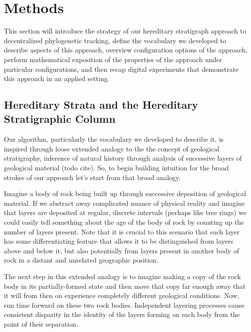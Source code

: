 \section{Methods} \label{sec:methods}

This section will introduce the strategy of our hereditary stratigraph approach to decentralized phylogenetic tracking, define the vocabulary we developed to describe aspects of this approach, overview configuration options of the approach, perform mathematical exposition of the properties of the approach under particular configurations, and then recap digital experiments that demonstrate this approach in an applied setting.

\subsection{Hereditary Strata and the Hereditary Stratigraphic Column}



Our algorithm, particularly the vocabulary we developed to describe it, is inspired through loose extended analogy to the the concept of geological stratigraphy, inference of natural history through analysis of successive layers of geological material (todo cite).
So, to begin building intuition for the broad strokes of our approach let's start from that broad analogy.

Imagine a body of rock being built up through successive deposition of geological material.
If we abstract away complicated nuance of physical reality and imagine that layers are deposited at regular, discrete intervals (perhaps like tree rings) we could easily tell something about the age of the body of rock by counting up the number of layers present.
Note that it is crucial to this scenario that each layer has some differentiating feature that allows it to be distinguished from layers above and below it, but also potentially from layers present in another body of rock in a distant and unrelated geographic position.

The next step in this extended analogy is to imagine making a copy of the rock body in its partially-formed state and then move that copy far enough away that it will from then on experience completely different geological conditions.
Now, run time forward on these two rock bodies.
Independent layering processes cause consistent disparity in the identity of the layers forming on each body from the point of their separation.

